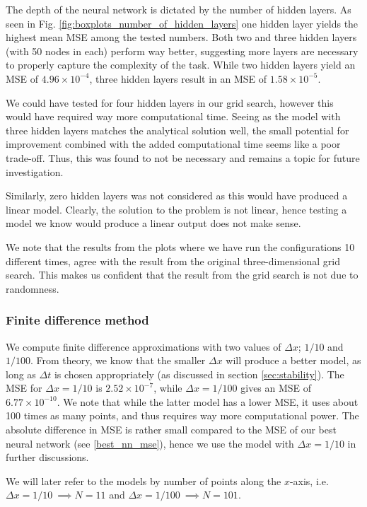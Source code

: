 The depth of the neural network is dictated by the number of hidden layers.
As seen in Fig. \ref{fig:boxplots_number_of_hidden_layers} one hidden layer yields the highest mean MSE among the tested numbers. 
Both two and three hidden layers (with 50 nodes in each) perform way better, suggesting more layers are necessary to properly capture the complexity of the task. 
While two hidden layers yield an MSE of $4.96 \times 10^{-4}$, three hidden layers result in an MSE of $1.58 \times 10^{-5}$.

We could have tested for four hidden layers in our grid search, however this would have required way more computational time.
Seeing as the model with three hidden layers matches the analytical solution well, the small potential for improvement combined with the added computational time seems like a poor trade-off. 
Thus, this was found to not be necessary and remains a topic for future investigation.

Similarly, zero hidden layers was not considered as this would have produced a linear model.
Clearly, the solution to the problem is not linear, hence testing a model we know would produce a linear output does not make sense.

We note that the results from the plots where we have run the configurations 10 different times, agree with the result from the original three-dimensional grid search.
This makes us confident that the result from the grid search is not due to randomness.

\subsubsection{Finite difference method}

We compute finite difference approximations with two values of $\Delta x$; $1/10$ and $1/100$.
From theory, we know that the smaller $\Delta x$ will produce a better model, as long as $\Delta t$ is chosen appropriately (as discussed in section \ref{sec:stability}).
The MSE for $\Delta x = 1/10$ is $2.52\times 10^{-7}$, while $\Delta x = 1/100$ gives an MSE of $6.77\times 10^{-10}$.
We note that while the latter model has a lower MSE, it uses about 100 times as many points, and thus requires way more computational power.
The absolute difference in MSE is rather small compared to the MSE of our best neural network (see \ref{best_nn_mse}), hence we use the model with $\Delta x = 1/10$ in further discussions.

We will later refer to the models by number of points along the $x$-axis, i.e. $\Delta x = 1/10 \ \implies N = 11$ and $\Delta x = 1/100 \ \implies N = 101$.

